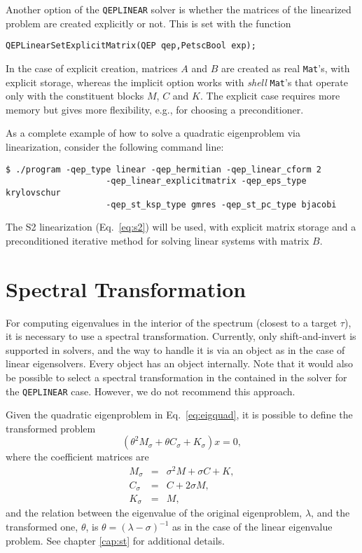 Another option of the \texttt{QEPLINEAR} solver is whether the matrices of the linearized problem are created explicitly or not. This is set with the function
	\begin{Verbatim}[fontsize=\small]
	QEPLinearSetExplicitMatrix(QEP qep,PetscBool exp);
	\end{Verbatim}
In the case of explicit creation, matrices $A$ and $B$ are created as real \texttt{Mat}'s, with explicit storage, whereas the implicit option works with \emph{shell} \texttt{Mat}'s that operate only with the constituent blocks $M$, $C$ and $K$. The explicit case requires more memory but gives more flexibility, e.g., for choosing a preconditioner.

As a complete example of how to solve a quadratic eigenproblem via linearization, consider the following command line:
\begin{Verbatim}[fontsize=\small]
	$ ./program -qep_type linear -qep_hermitian -qep_linear_cform 2
                    -qep_linear_explicitmatrix -qep_eps_type krylovschur
                    -qep_st_ksp_type gmres -qep_st_pc_type bjacobi
\end{Verbatim}
The S2 linearization (Eq.\ \ref{eq:s2}) will be used, with explicit matrix storage and a preconditioned iterative method for solving linear systems with matrix $B$.

\section{\label{sec:qst}Spectral Transformation}

For computing eigenvalues in the interior of the spectrum (closest to a target $\tau$), it is necessary to use a spectral transformation. Currently, only shift-and-invert is supported in  solvers, and the way to handle it is via an  object as in the case of linear eigensolvers. Every  object has an  object internally. Note that it would also be possible to select a spectral transformation in the  contained in the  solver for the \texttt{QEPLINEAR} case. However, we do not recommend this approach.

Given the quadratic eigenproblem in Eq.\ \ref{eq:eigquad}, it is possible to define the transformed problem
\begin{equation}
(\theta^2M_\sigma+\theta C_\sigma+K_\sigma)x=0,\label{eq:sinvquad}
\end{equation}
where the coefficient matrices are
\begin{eqnarray}
M_\sigma&\!\!=\!\!&\sigma^2 M+\sigma C+K,\\
C_\sigma&\!\!=\!\!&C+2\sigma M,\\
K_\sigma&\!\!=\!\!&M,
\end{eqnarray}
and the relation between the eigenvalue of the original eigenproblem, $\lambda$, and the transformed one, $\theta$, is $\theta=(\lambda-\sigma)^{-1}$ as in the case of the linear eigenvalue problem. See chapter \ref{cap:st} for additional details.

